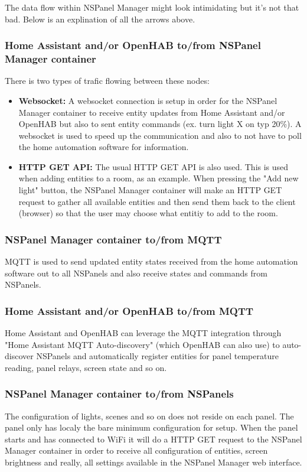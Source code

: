 \documentclass[10pt]{article}
\begin{document}
    The data flow within NSPanel Manager might look intimidating but it's not that bad. Below is an explination of all the arrows above.

    
    \subsubsection{Home Assistant and/or OpenHAB to/from NSPanel Manager container}
    There is two types of trafic flowing between these nodes:
    \begin{itemize}
      \item \textbf{Websocket:} A websocket connection is setup in order for the NSPanel Manager container to receive entity updates from Home Assistant and/or OpenHAB but also to sent entity commands (ex. turn light X on typ 20\%). A websocket is used to speed up the communication and also to not have to poll the home automation software for information.
      \item \textbf{HTTP GET API:} The usual HTTP GET API is also used. This is used when adding entities to a room, as an example. When pressing the "Add new light" button, the NSPanel Manager container will make an HTTP GET request to gather all available entities and then send them back to the client (browser) so that the user may choose what entitiy to add to the room.
    \end{itemize}
    \subsubsection{NSPanel Manager container to/from MQTT}
    MQTT is used to send updated entity states received from the home automation software out to all NSPanels and also receive states and commands from NSPanels.
    \subsubsection{Home Assistant and/or OpenHAB to/from MQTT}
    Home Assistant and OpenHAB can leverage the MQTT integration through "Home Assistant MQTT Auto-discovery" (which OpenHAB can also use) to auto-discover NSPanels and automatically register entities for panel temperature reading, panel relays, screen state and so on.
    \subsubsection{NSPanel Manager container to/from NSPanels}
    The configuration of lights, scenes and so on does not reside on each panel. The panel only has localy the bare minimum configuration for setup. When the panel starts and has connected to WiFi it will do a HTTP GET request to the NSPanel Manager container in order to receive all configuration of entities, screen brightness and really, all settings available in the NSPanel Manager web interface.
\end{document}
